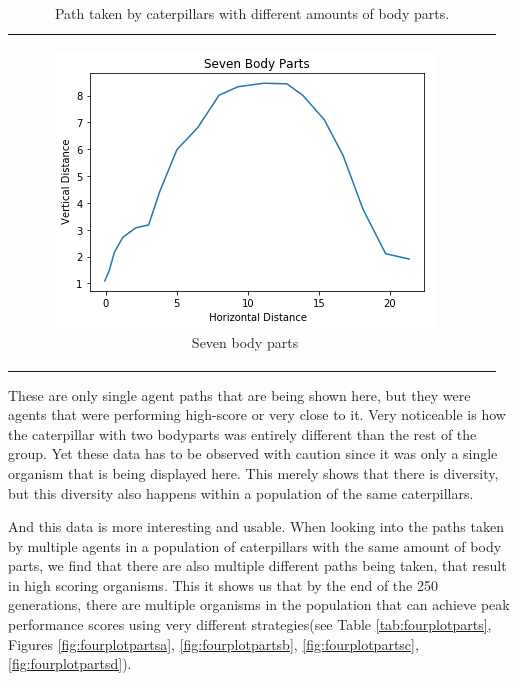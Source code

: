 \documentclass[12pt,oneside,listof=totoc,paper=a4,headings=small]{scrbook}
\begin{document}
{\begin{table}[ht]
\begin{tabular}{cc}
\begin{subfigure}{0.4\textwidth}\centering\includegraphics[width=0.75\columnwidth]{images/SevenBodyParts.png}\caption{Seven body parts}\label{fig:partstabf}\end{subfigure}\\
\end{tabular}
\caption{Path taken by caterpillars with different amounts of body parts.}
\label{tab:pathplotparts}
\end{table}
}

These are only single agent paths that are being shown here, but they were agents that were performing high-score or very close to it. Very noticeable is how the caterpillar with two bodyparts was entirely different than the rest of the group. Yet these data has to be observed with caution since it was only a single organism that is being displayed here. This merely shows that there is diversity, but this diversity also happens within a population of the same caterpillars. 

\newpage

And this data is more interesting and usable. When looking into the paths taken by multiple agents in a population of caterpillars with the same amount of body parts, we find that there are also multiple different paths being taken, that result in high scoring organisms. This it shows us that by the end of the 250 generations, there are multiple organisms in the population that can achieve peak performance scores using very different strategies(see Table \ref{tab:fourplotparts}, Figures \ref{fig:fourplotpartsa}, \ref{fig:fourplotpartsb}, \ref{fig:fourplotpartsc}, \ref{fig:fourplotpartsd}).
\end{document}
